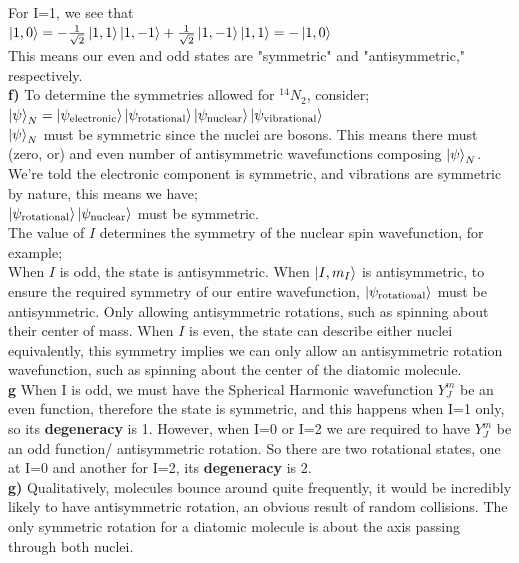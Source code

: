 \documentclass[12pt]{article}
\begin{document}
For I=1, we see that \\

$\ket{1,0}=-\frac{1}{\sqrt{2}}\ket{1,1}\ket{1,-1}+\frac{1}{\sqrt{2}}\ket{1,-1}\ket{1,1}=-\ket{1,0}$\\

This means our even and odd states are "symmetric" and "antisymmetric," respectively.\\

\textbf{f) } To determine the symmetries allowed for $^{14}N_2$, consider; \\
$\ket{\psi}_{N}=\ket{\psi_{\text{electronic}}}\ket{\psi_{\text{rotational}}}\ket{\psi_{\text{nuclear}}}\ket{\psi_{\text{vibrational}}}$\\



$\ket{\psi}_{N}$ must be symmetric since the nuclei are bosons. This means there must (zero, or) and even number of antisymmetric wavefunctions composing $\ket{\psi}_{{N}}$. We're told the electronic component is symmetric, and vibrations are symmetric by nature, this means we have;\\ $\ket{\psi_{\text{rotational}}}\ket{\psi_{\text{nuclear}}}$ must be symmetric.\\

The value of $I$ determines the symmetry of the nuclear spin wavefunction, for example;\\
When $I$ is odd, the state is antisymmetric. When $\ket{I,m_I}$ is antisymmetric, to ensure the required symmetry of our entire wavefunction, $\ket{\psi_{\text{rotational}}}$ must be antisymmetric. Only allowing antisymmetric rotations, such as spinning about their center of mass. When $I$ is even, the state can describe either nuclei equivalently, this symmetry implies we can only allow an antisymmetric rotation wavefunction, such as spinning about the center of the diatomic molecule.  \\

\textbf{g} When I is odd, we must have the Spherical Harmonic wavefunction $Y^m_J$ be an even function, therefore the state is symmetric, and this happens when I=1 only, so its \textbf{degeneracy} is 1. However, when I=0 or I=2 we are required to have $Y^m_J$ be an odd function/ antisymmetric rotation. So there are two rotational states, one at I=0 and another for I=2, its \textbf{degeneracy} is 2.\\

\textbf{g)} Qualitatively, molecules bounce around quite frequently, it would be incredibly likely to have antisymmetric rotation, an obvious result of random collisions. The only symmetric rotation for a diatomic molecule is about the axis passing through both nuclei.\\
\end{document}
